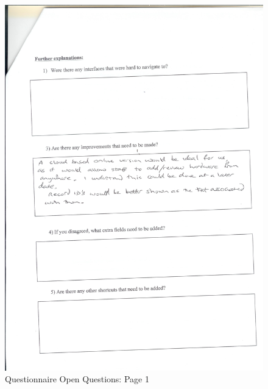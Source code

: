 \begin{figure}[H]
    \includegraphics[width=\textwidth]{./Evaluation/EvaluationQuestionnaire/Scan12.jpeg}
    \caption{Questionnaire Open Questions: Page 1} \label{fig:q1}
\end{figure}

